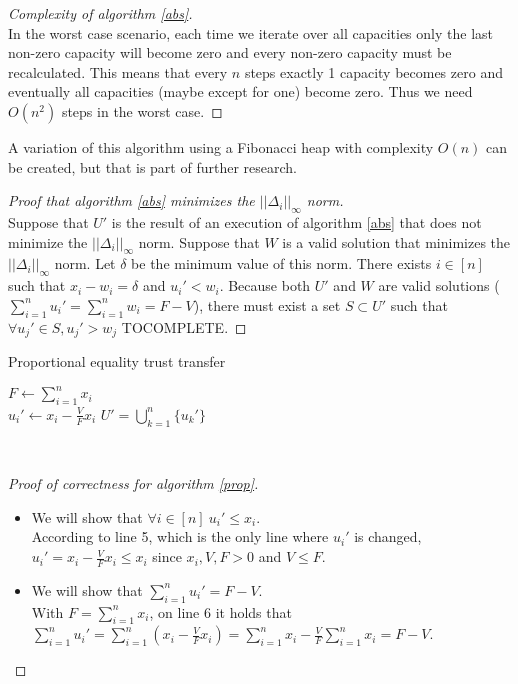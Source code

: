 \documentclass[11pt]{article}
\theoremstyle{definition}
\theoremstyle{corollary}
\theoremstyle{lemma}
\begin{document}
    \begin{proof}[Complexity of algorithm \ref{abs}] \ \\
       In the worst case scenario, each time we iterate over all capacities only the last non-zero capacity will become zero
       and every non-zero capacity must be recalculated. This means that every $n$ steps exactly 1 capacity becomes zero
       and eventually all capacities (maybe except for one) become zero. Thus we need $O(n^2)$ steps in the worst case.
    \end{proof}
    A variation of this algorithm using a Fibonacci heap with complexity $O(n)$ can be created, but that is part of 
    further research.
    \begin{proof}[Proof that algorithm \ref{abs} minimizes the $||\Delta_i||_\infty$ norm] \ \\
       Suppose that $U'$ is the result of an execution of algorithm \ref{abs} that does not minimize the $||\Delta_i||_\infty$
       norm. Suppose that $W$ is a valid solution that minimizes the $||\Delta_i||_\infty$ norm. Let $\delta$ be the minimum
       value of this norm. There exists $i \in [n]$ such that $x_i - w_i = \delta$ and $u_i' < w_i$. Because both $U'$
       and $W$ are valid solutions ($\sum\limits_{i=1}^{n}u_i' = \sum\limits_{i=1}^{n}w_i = F - V$), there must exist a set
       $S \subset U'$ such that $\forall u_j' \in S, u_j' > w_j$ TOCOMPLETE.
    \end{proof}
    \begin{algorithm}[H]
       \label{prop}
       \caption{Proportional equality trust transfer}
       $F \gets \sum\limits_{i=1}^{n}x_i$ \\
          {$u_i' \gets x_i - \frac{V}{F} x_i$}
       \Return $U' = \bigcup\limits_{k=1}^{n}\{u_k'\}$
    \end{algorithm} \ \\
    \begin{proof}[Proof of correctness for algorithm \ref{prop}] \
       \begin{itemize}
          \item We will show that $\forall i \in [n] \: u_i' \leq x_i$. \\
          According to line 5, which is the only line where $u_i'$ is changed, $u_i' = x_i - \frac{V}{F}x_i \leq x_i$
          since $x_i, V, F > 0$ and $V \leq F$.
          \item We will show that $\sum\limits_{i=1}^{n}u_i' = F - V$. \\
          With $F = \sum\limits_{i=1}^{n}x_i$, on line 6 it holds that $\sum\limits_{i=1}^{n}u_i' = \sum\limits_{i=1}^{n}
          (x_i - \frac{V}{F}x_i) = \sum\limits_{i=1}^{n}x_i - \frac{V}{F}\sum\limits_{i=1}^{n}x_i = F - V$.
       \end{itemize}
    \end{proof}
\end{document}
